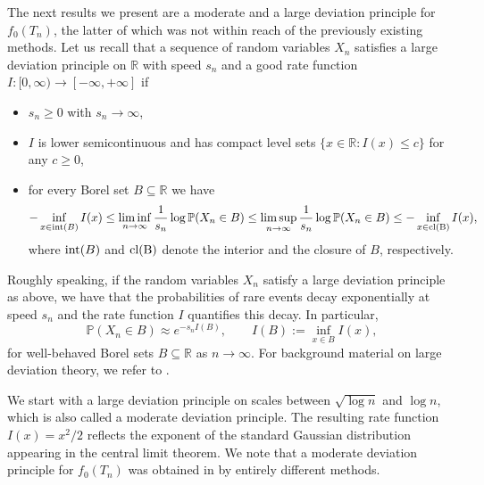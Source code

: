 \documentclass[11pt,a4paper]{article}
\numberwithin{equation}{section}
\def\PP{\mathbb{P}}
\def\RR{\mathbb{R}}
\begin{document}
The next results we present are a moderate and a large deviation principle for $f_0(T_n)$, the latter of which was not within reach of the previously existing methods. Let us recall that a sequence of random variables $X_n$ satisfies a large deviation principle on $\RR$ with speed $s_n$ and a good rate function $I:[0,\infty)\to[-\infty,+\infty]$ if
\begin{itemize}
    \item[-] $s_n\geq 0$ with $s_n\to\infty$,
    \item[-] $I$ is lower semicontinuous and has compact level sets $\{x\in\RR:I(x)\leq c\}$ for any $c\geq 0$,
    \item[-] for every Borel set $B\subseteq\RR$ we have
    \begin{align*}
        -\inf_{x\in{\rm int}(B)}I(x) \leq \liminf_{n\to\infty}{1\over s_n}\log\PP(X_n\in B) \leq \limsup_{n\to\infty}{1\over s_n}\log\PP(X_n\in B) \leq -\inf_{x\in{\rm cl(B)}}I(x),
    \end{align*}
    where ${\rm int}(B)$ and ${\rm cl(B)}$ denote the interior and the closure of $B$, respectively.
\end{itemize}
Roughly speaking, if the random variables $X_n$ satisfy a large deviation principle as above, we have that the probabilities of rare events decay exponentially at speed $s_n$ and the rate function $I$ quantifies this decay. In particular,
$$
\PP(X_n\in B) \approx e^{-s_n I(B)},\qquad I(B):=\inf_{x\in B}I(x),
$$
for well-behaved Borel sets $B\subseteq\RR$ as $n\to\infty$. For background material on large deviation theory, we refer to \cite{DZlargeDeviations,DenHollander}.

We start with a large deviation principle on scales between $\sqrt{\log n}$ and $\log n$, which is also called a moderate deviation principle. The resulting rate function $I(x)=x^2/2$ reflects the exponent of the standard Gaussian distribution appearing in the central limit theorem. We note that a moderate deviation principle for $f_0(T_n)$ was obtained in \cite{GT:2021} by entirely different methods.
\end{document}
